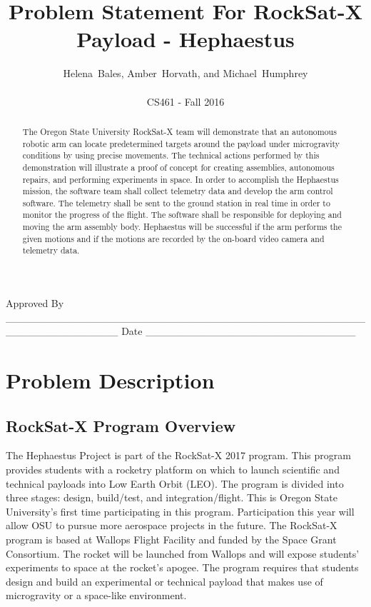 \documentclass[letterpaper,10pt]{article}
\title{Problem Statement For RockSat-X Payload - Hephaestus}
\author{Helena~Bales, Amber~Horvath, and Michael~Humphrey\\ \\ CS461 - Fall 2016}
\newenvironment{bottompar}{\par\vspace*{\fill}}{\clearpage}
\begin{document}
\maketitle

\begin{abstract}
The Oregon State University RockSat-X team will demonstrate that an autonomous robotic arm can
locate predetermined targets around the payload under microgravity conditions by using precise
movements. The technical actions performed by this demonstration will illustrate a proof of concept
for creating assemblies, autonomous repairs, and performing experiments in space. In order to
accomplish the Hephaestus mission, the software team shall collect telemetry data and develop the arm
control software. The telemetry shall be sent to the ground station in real time in order to monitor 
the progress of the flight. The software shall be responsible for deploying and moving the arm 
assembly body. Hephaestus will be successful if the arm performs the given motions and if the motions
 are recorded by the on-board video camera and telemetry data.
\end{abstract}

\begin{bottompar}
Approved By
\_\_\_\_\_\_\_\_\_\_\_\_\_\_\_\_\_\_\_\_\_\_\_\_\_\_\_\_\_\_\_\_\_\_\_\_\_\_\_\_\_\_\_\_\_\_\_\_\_\_\_\_\_\_\_\_\_\_\_\_\_\_\_
Date \_\_\_\_\_\_\_\_\_\_\_\_\_\_\_\_\_\_\_\_\_\_\_\_\_\_\_\_
\end{bottompar}

\clearpage

\section{Problem Description}
\subsection{RockSat-X Program Overview}
The Hephaestus Project is part of the RockSat-X 2017 program. This program provides students with a 
rocketry platform on which to launch scientific and technical payloads into Low Earth Orbit (LEO). 
The program is divided into three stages: design, build/test, and integration/flight. This is Oregon 
 State University's first time participating in this program. Participation this year will allow OSU
   to pursue more aerospace projects in the future. The RockSat-X program is based at Wallops Flight 
Facility and funded by the Space Grant Consortium. The rocket will be launched from Wallops and will
 expose students' experiments to space at the rocket's apogee. The program requires that students 
design and build an experimental or technical payload that makes use of microgravity or a space-like
environment.
\end{document}
